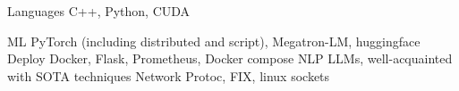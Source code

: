 
\begin{cvskills}
  \cvskill
    {Languages} %
    {C++, Python, CUDA} %

  \cvskill
    {ML} %
    {PyTorch (including distributed and script), Megatron-LM, huggingface} %
  \cvskill
    {Deploy}
    {Docker, Flask, Prometheus, Docker compose}
  \cvskill
    {NLP}
    {LLMs, well-acquainted with SOTA techniques}
  \cvskill
    {Network}
    {Protoc, FIX, linux sockets}
\end{cvskills}
